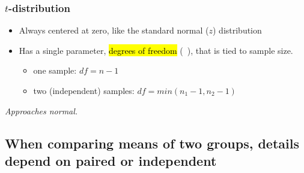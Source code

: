 \documentclass[slidestop,compress,mathserif,12pt,t,professionalfonts,xcolor=table]{beamer}
\newcommand{\soln}[1]{\textit{#1}}
\begin{document}
\begin{frame}
\frametitle{$t$-distribution}

\begin{itemize}

\item Always centered at zero, like the standard normal ($z$) distribution

\pause

\item Has a single parameter, \hl{degrees of freedom} (~), that is tied to sample size.
\begin{itemize}
\item one sample: $df = n - 1$
\item two (independent) samples: $df = min(n_1 - 1, n_2 - 1)$
\end{itemize}

\end{itemize}

\pause

{
\soln{\pause Approaches normal.}
\pause
{}
}

\end{frame}


\subsection{When comparing means of two groups, details depend on paired or independent}
\label{mi2}

\end{document}
